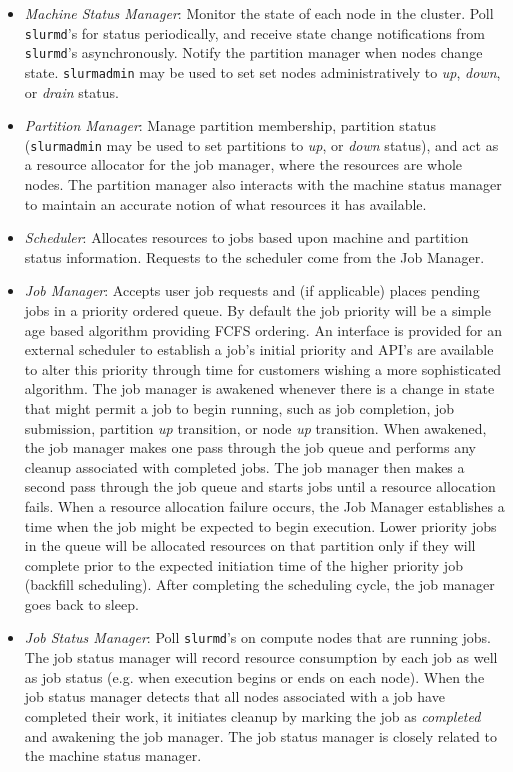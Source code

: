 \begin{itemize}
\item {\em Machine Status Manager}: Monitor the state of each 
node in the cluster.  Poll {\tt slurmd}'s for status periodically, and 
receive state change notifications from {\tt slurmd}'s asynchronously.
Notify the partition manager when nodes change state.
{\tt slurmadmin} may be used to set set nodes administratively to 
{\em up}, {\em down}, or {\em drain} status.

\item {\em Partition Manager}:  Manage partition membership, partition
status ({\tt slurmadmin} may be used to set
partitions to {\em up}, or {\em down} status), and
act as a resource allocator for the job manager, where the resources 
are whole nodes.  The partition manager also interacts with the machine 
status manager to maintain an accurate notion of what resources it has 
available.

\item {\em Scheduler}: Allocates resources to jobs based upon machine and 
partition status information. Requests to the scheduler come from the 
Job Manager.

\item {\em Job Manager}: Accepts user job requests and (if applicable) 
places pending jobs in a priority ordered queue. By default the job 
priority will be a simple age based algorithm providing FCFS ordering. 
An interface is provided for an external scheduler to establish 
a job's initial priority and API's are available to alter this priority 
through time for customers wishing a more sophisticated algorithm.
The job manager is awakened whenever there is a change in state that 
might permit a job to begin running, such as job completion, job submission, 
partition {\em up} transition, or node {\em up} transition.
When awakened, the job manager makes one pass through the job queue and
performs any cleanup associated with completed jobs.
The job manager then makes a second pass through the job queue and
starts jobs until a resource allocation fails. 
When a resource allocation failure occurs, the Job Manager establishes 
a time when the job might be expected to begin execution. 
Lower priority jobs in the queue will be allocated resources on that 
partition only if they will complete prior to the expected initiation 
time of the higher priority job (backfill scheduling).
After completing the scheduling cycle, the job manager goes back to sleep.

\item {\em Job Status Manager}:
Poll {\tt slurmd}'s on compute nodes that are running jobs. 
The job status manager will record resource consumption by each job as 
well as job status (e.g. when execution begins or ends on each node). 
When the job status manager detects that all nodes associated with a 
job have completed 
their work, it initiates cleanup by marking the job as {\em completed} 
and awakening the job manager.  The job status manager is closely related to
the machine status manager.


\end{itemize}
